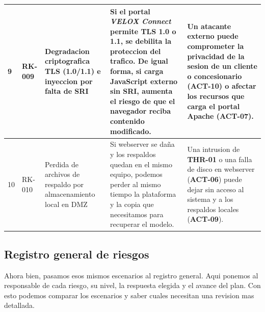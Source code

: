 \documentclass[letterpaper,11pt]{article}
\begin{document}
\begin{longtable}{|C{0.6cm}|C{1.3cm}|L{2.8cm}|L{5.8cm}|L{5.8cm}|}
9
  & RK-009
  & Degradacion criptografica TLS (1.0/1.1) e inyeccion por falta de
SRI
  & Si el portal \textit{VELOX Connect} permite TLS 1.0 o 1.1, se
debilita la proteccion del trafico. De igual forma, si carga
JavaScript externo sin SRI, aumenta el riesgo de que el navegador
reciba contenido modificado.
  & Un atacante externo puede comprometer la privacidad de la sesion de
un cliente o concesionario (\textbf{ACT-10}) o afectar los recursos
que carga el portal Apache (\textbf{ACT-07}). \\
\hline

10
  & RK-010
  & Perdida de archivos de respaldo por almacenamiento local en DMZ
  & Si webserver se daña y los respaldos quedan en el mismo equipo,
podemos perder al mismo tiempo la plataforma y la copia que
necesitamos para recuperar el modelo.
  & Una intrusion de \textbf{THR-01} o una falla de disco en webserver
(\textbf{ACT-06}) puede dejar sin acceso al sistema y a los
respaldos locales (\textbf{ACT-09}). \\
\hline
\end{longtable}
\endgroup

\subsection{Registro general de riesgos}

Ahora bien, pasamos esos mismos escenarios al registro general. Aqui
ponemos al responsable de cada riesgo, su nivel, la respuesta
elegida y el avance del plan. Con esto podemos comparar los
escenarios y saber cuales necesitan una revision mas detallada.
\end{document}
